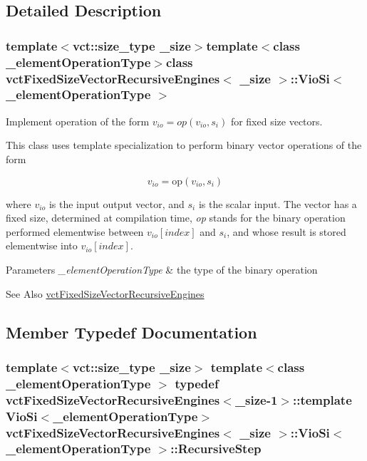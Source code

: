\subsection{Detailed Description}
\subsubsection*{template$<$vct\-::size\-\_\-type \-\_\-size$>$template$<$class \-\_\-element\-Operation\-Type$>$class vct\-Fixed\-Size\-Vector\-Recursive\-Engines$<$ \-\_\-size $>$\-::\-Vio\-Si$<$ \-\_\-element\-Operation\-Type $>$}

Implement operation of the form $ v_{io} = op(v_{io}, s_i)$ for fixed size vectors. 

This class uses template specialization to perform binary vector operations of the form

\[ v_{io} = \mathrm{op}(v_{io}, s_{i}) \]

where $v_{io}$ is the input output vector, and $s_{i}$ is the scalar input. The vector has a fixed size, determined at compilation time, {\itshape op} stands for the binary operation performed elementwise between $v_{io}[index]$ and $s_{i}$, and whose result is stored elementwise into $v_{io}[index]$.


\begin{DoxyParams}{Parameters}
{\em \-\_\-element\-Operation\-Type} & the type of the binary operation\\
\hline
\end{DoxyParams}
\begin{DoxySeeAlso}{See Also}
\hyperlink{classvct_fixed_size_vector_recursive_engines}{vct\-Fixed\-Size\-Vector\-Recursive\-Engines} 
\end{DoxySeeAlso}


\subsection{Member Typedef Documentation}
\hypertarget{classvct_fixed_size_vector_recursive_engines_1_1_vio_si_aa8b9d5743826725a5da54114f23fea1e}{
\subsubsection[{Recursive\-Step}]{\setlength{\rightskip}{0pt plus 5cm}template$<$vct\-::size\-\_\-type \-\_\-size$>$ template$<$class \-\_\-element\-Operation\-Type $>$ typedef {\bf vct\-Fixed\-Size\-Vector\-Recursive\-Engines}$<$\-\_\-size-\/1$>$\-::template {\bf Vio\-Si}$<$\-\_\-element\-Operation\-Type$>$ {\bf vct\-Fixed\-Size\-Vector\-Recursive\-Engines}$<$ \-\_\-size $>$\-::{\bf Vio\-Si}$<$ \-\_\-element\-Operation\-Type $>$\-::{\bf Recursive\-Step}}}\label{classvct_fixed_size_vector_recursive_engines_1_1_vio_si_aa8b9d5743826725a5da54114f23fea1e}



